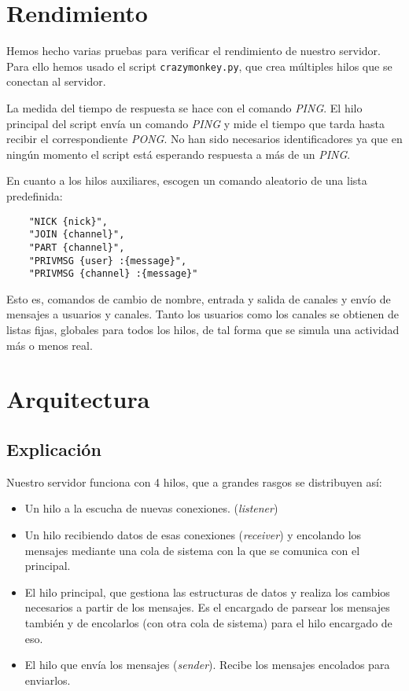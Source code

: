 \documentclass[nochap]{apuntes}
\begin{document}
\section{Rendimiento}

Hemos hecho varias pruebas para verificar el rendimiento de nuestro servidor. Para ello hemos usado el script \texttt{crazymonkey.py}, que crea múltiples hilos que se conectan al servidor. 

La medida del tiempo de respuesta se hace con el comando \textit{PING}. El hilo principal del script envía un comando \textit{PING} y mide el tiempo que tarda hasta recibir el correspondiente \textit{PONG}. No han sido necesarios identificadores ya que en ningún momento el script está esperando respuesta a más de un \textit{PING}.

En cuanto a los hilos auxiliares, escogen un comando aleatorio de una lista predefinida:

\begin{verbatim}
	"NICK {nick}",
	"JOIN {channel}",
	"PART {channel}",
	"PRIVMSG {user} :{message}",
	"PRIVMSG {channel} :{message}"
\end{verbatim}

Esto es, comandos de cambio de nombre, entrada y salida de canales y envío de mensajes a usuarios y canales. Tanto los usuarios como los canales se obtienen de listas fijas, globales para todos los hilos, de tal forma que se simula una actividad más o menos real.

\section{Arquitectura}

\subsection{Explicación}

Nuestro servidor funciona con 4 hilos, que a grandes rasgos se distribuyen así:
\begin{itemize}
\item  Un hilo a la escucha de nuevas conexiones. (\emph{listener})
\item Un hilo recibiendo datos de esas conexiones (\emph{receiver}) y encolando los mensajes mediante una cola de sistema con la que se comunica con el principal.
\item El hilo principal, que gestiona las estructuras de datos y realiza los cambios necesarios a partir de los mensajes. Es el encargado de parsear los mensajes también y de encolarlos (con otra cola de sistema) para el hilo encargado de eso.
\item El hilo que envía los mensajes (\emph{sender}). Recibe los mensajes encolados para enviarlos.
\end{itemize}
\end{document}
